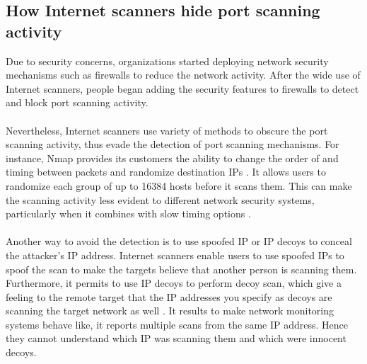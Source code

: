 	\subsection{How Internet scanners hide port scanning activity}
	Due to security concerns, organizations started deploying network security mechanisms such as firewalls to reduce the network activity.
	After the wide use of Internet scanners, people began adding the security features to firewalls to detect and block port scanning activity.\\\\
	Nevertheless, Internet scanners use variety of methods to obscure the port scanning activity, thus evade the detection of port scanning mechanisms. 
    For instance, Nmap provides its customers the ability to change the order of and timing between packets and randomize destination IPs \cite{lee2003detection}.
    It allows users to randomize each group of up to 16384 hosts before it scans them.
    This can make the scanning activity less evident to different network security systems, particularly when it combines with slow timing options \cite{nmap1}.\\\\
    Another way to avoid the detection is to use spoofed IP or IP decoys to conceal the attacker's IP address.
    Internet scanners enable users to use spoofed IPs to spoof the scan to make the targets believe that another person is scanning them.
    Furthermore, it permits to use IP decoys to perform decoy scan, which give a feeling to the remote target that the IP addresses you specify as decoys are scanning the target network as well \cite{nmap1}. 
    It results to make network monitoring systems behave like, it reports multiple scans from the same IP address. 
    Hence they cannot understand which IP was scanning them and which were innocent decoys.

